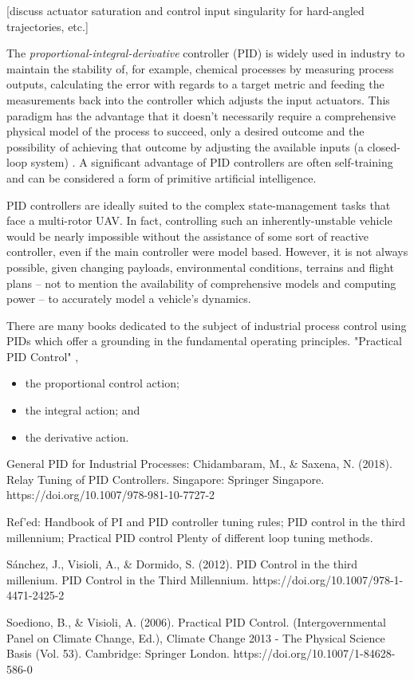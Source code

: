\documentclass[10pt]{article}
\begin{document}
[discuss actuator saturation and control input singularity for hard-angled trajectories, etc.]


The \emph{proportional-integral-derivative} controller (PID) is widely used in industry \cite{Soediono1989} to maintain the stability of, for example, chemical processes by measuring process outputs, calculating the error with regards to a target metric and feeding the measurements back into the controller which adjusts the input actuators. This paradigm has the advantage that it doesn’t necessarily require a comprehensive physical model of the process to succeed, only a desired outcome and the possibility of achieving that outcome by adjusting the available inputs (a closed-loop system) 	\cite{Soediono1989}. A significant advantage of PID controllers are often self-training and can be considered a form of primitive artificial intelligence.

PID controllers are ideally suited to the complex state-management tasks that face a multi-rotor UAV. In fact, controlling such an inherently-unstable vehicle would be nearly impossible without the assistance of some sort of reactive controller, even if the main controller were model based. However, it is not always possible, given changing payloads, environmental conditions, terrains and flight plans -- not to mention the availability of comprehensive models and computing power -- to accurately model a vehicle’s dynamics.

There are many books dedicated to the subject of industrial process control using PIDs which offer a grounding in the fundamental operating principles. "Practical PID Control" \cite{Soediono1989}, 

\begin{itemize}
\item the proportional control action;
\item the integral action; and
\item the derivative action.
\end{itemize}

General PID for Industrial Processes:
\cite{Saxena}
Chidambaram, M., \& Saxena, N. (2018). Relay Tuning of PID Controllers. Singapore: Springer Singapore. https://doi.org/10.1007/978-981-10-7727-2

Ref’ed: Handbook of PI and  PID controller tuning rules; PID control in the third millennium; Practical PID control
Plenty of different loop tuning methods.

\cite{Sanchez2012}
Sánchez, J., Visioli, A., \& Dormido, S. (2012). PID Control in the third millenium. PID Control in the Third Millennium. https://doi.org/10.1007/978-1-4471-2425-2

\cite{Soediono1989}
Soediono, B., \& Visioli, A. (2006). Practical PID Control. (Intergovernmental Panel on Climate Change, Ed.), Climate Change 2013 - The Physical Science Basis (Vol. 53). Cambridge: Springer London. https://doi.org/10.1007/1-84628-586-0


\newpage


\end{document}
